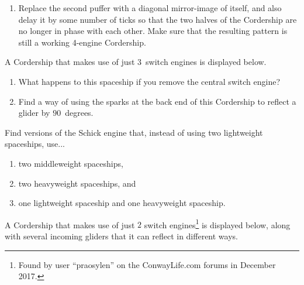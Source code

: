 \begin{multicols}{2}
\begin{problem}
\begin{enumerate}[label=\bf\color{ocre}(\alph*)]
			\item Replace the second puffer with a diagonal mirror-image of itself, and also delay it by some number of ticks so that the two halves of the Cordership are no longer in phase with each other. Make sure that the resulting pattern is still a working 4-engine Cordership.
		\end{enumerate}
	\end{problem}
	
	
	\mfilbreak
	
	
	\begin{problemstar}\label{exer:3_engine_cordership} 
		A Cordership that makes use of just $3$~switch engines is displayed below.
		
		\begin{center}
		\end{center}
		
		\begin{enumerate}[label=\bf\color{ocre}(\alph*)]
			\item What happens to this spaceship if you remove the central switch engine?
			
			\item Find a way of using the sparks at the back end of this Cordership to reflect a glider by $90$~degrees. %
		\end{enumerate}
	\end{problemstar}


	\mfilbreak
	
	
	\begin{problem}\label{exer:schick_mwss_hwss} 
		Find versions of the Schick engine that, instead of using two lightweight spaceships, use...\smallskip
		\begin{enumerate}[label=\bf\color{ocre}(\alph*)]
			\item two middleweight spaceships,
			
			\item two heavyweight spaceships, and
			
			\item one lightweight spaceship and one heavyweight spaceship.
		\end{enumerate}
	\end{problem}
	
	
	\mfilbreak
	
	
	\begin{problemstar}\label{exer:2_engine_cordership} 
		A Cordership that makes use of just $2$ switch engines\footnote{Found by user ``praosylen'' on the ConwayLife.com forums in December 2017.} is displayed below, along with several incoming gliders that it can reflect in different ways.
		

\end{problemstar}
\end{multicols}
